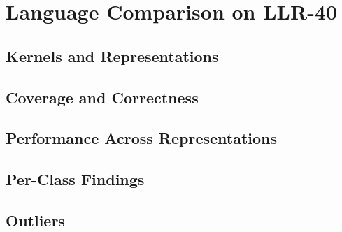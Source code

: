 \chapter{Language Comparison on LLR-40}
\label{ch:llr40}

\section{Kernels and Representations}

\section{Coverage and Correctness}

\section{Performance Across Representations}

\section{Per-Class Findings}

\section{Outliers}
